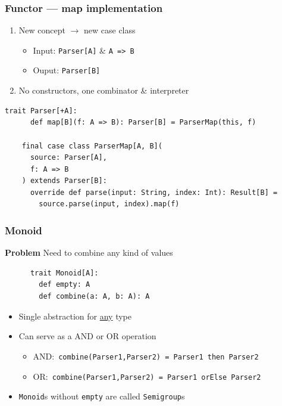 \begin{frame}[fragile]
  \frametitle{Functor --- map implementation}

  \begin{enumerate}
    \item New concept \({\rightarrow}\) new case class
          \begin{itemize}
            \item Input: \texttt{Parser[A]} \& \texttt{A => B}
            \item Ouput: \texttt{Parser[B]}
          \end{itemize}
    \item No constructors, one combinator \& interpreter
  \end{enumerate}

  \begin{lstlisting}[gobble=4]
    trait Parser[+A]:
      def map[B](f: A => B): Parser[B] = ParserMap(this, f)

    final case class ParserMap[A, B](
      source: Parser[A],
      f: A => B
    ) extends Parser[B]:
      override def parse(input: String, index: Int): Result[B] =
        source.parse(input, index).map(f)
  \end{lstlisting}
\end{frame}

\begin{frame}[fragile]
  \frametitle{Monoid}

  \textbf{Problem} Need to combine any kind of values

  \begin{definition}[Monoid]
    \begin{lstlisting}
      trait Monoid[A]:
        def empty: A
        def combine(a: A, b: A): A
    \end{lstlisting}
  \end{definition}

  \begin{itemize}
    \item Single abstraction for \ul{any} type
    \item Can serve as a AND or OR operation
          \begin{itemize}
            \item AND:\ \texttt{combine(Parser1,Parser2) = Parser1 then Parser2}
            \item OR:\ \texttt{combine(Parser1,Parser2) = Parser1 orElse Parser2}
          \end{itemize}
    \item \texttt{Monoid}s without \texttt{empty} are called \texttt{Semigroup}s
  \end{itemize}
\end{frame}

